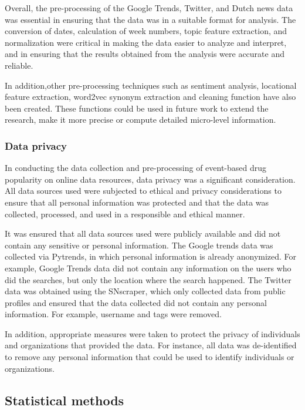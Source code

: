 Overall, the pre-processing of the Google Trends, Twitter, and Dutch news data was essential in ensuring that the data was in a suitable format for analysis. The conversion of dates, calculation of week numbers, topic feature extraction, and normalization were critical in making the data easier to analyze and interpret, and in ensuring that the results obtained from the analysis were accurate and reliable.

In addition,other pre-processing techniques such as sentiment analysis, locational feature extraction, word2vec synonym extraction and cleaning function have also been created. These functions could be used in future work to extend the research, make it more precise or compute detailed micro-level information.

\subsubsection{Data privacy}

In conducting the data collection and pre-processing of event-based drug popularity on online data resources, data privacy was a significant consideration. All data sources used were subjected to ethical and privacy considerations to ensure that all personal information was protected and that the data was collected, processed, and used in a responsible and ethical manner.

It was ensured that all data sources used were publicly available and did not contain any sensitive or personal information. The Google trends data was collected via Pytrends, in which personal information is already anonymized. For example, Google Trends data did not contain any information on the users who did the searches, but only the location where the search happened. The Twitter data was obtained using the SNscraper, which only collected data from public profiles and ensured that the data collected did not contain any personal information. For example, username and tags were removed.

In addition, appropriate measures were taken to protect the privacy of individuals and organizations that provided the data. For instance, all data was de-identified to remove any personal information that could be used to identify individuals or organizations.

\subsection {Statistical methods}


